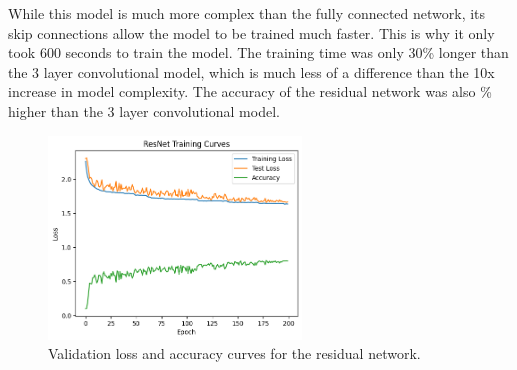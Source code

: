 \documentclass{article}
\begin{document}
While this model is much more complex than the fully connected network, its skip connections allow the model to be trained much faster. This is why it only took 600 seconds to train the model. The training time was only 30\% longer than the 3 layer convolutional model, which is much less of a difference than the 10x increase in model complexity. The accuracy of the residual network was also \% higher than the 3 layer convolutional model.

\begin{figure}[ht]
    \centering
    \includegraphics[width=0.6\textwidth]{output/graph2.png}
    \caption{Validation loss and accuracy curves for the residual network.}
    \label{fig:res_loss}
\end{figure}
\end{document}
